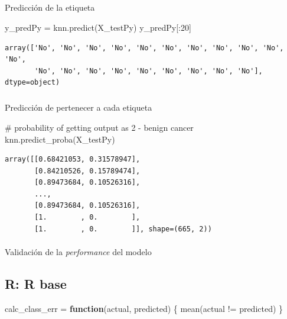 \documentclass[
  letterpaper,
  DIV=11,
  numbers=noendperiod]{scrartcl}
\makeatletter
\let\oldparagraph\paragraph
\renewcommand{\paragraph}{
    \@ifstar
      \xxxParagraphStar
      \xxxParagraphNoStar
  }
\newcommand{\xxxParagraphStar}[1]{\oldparagraph*{#1}\mbox{}}
\newcommand{\xxxParagraphNoStar}[1]{\oldparagraph{#1}\mbox{}}
\let\oldsubparagraph\subparagraph
\renewcommand{\subparagraph}{
    \@ifstar
      \xxxSubParagraphStar
      \xxxSubParagraphNoStar
  }
\newcommand{\xxxSubParagraphStar}[1]{\oldsubparagraph*{#1}\mbox{}}
\newcommand{\xxxSubParagraphNoStar}[1]{\oldsubparagraph{#1}\mbox{}}
\newenvironment{Shaded}{\begin{snugshade}}{\end{snugshade}}
\newcommand{\CommentTok}[1]{\textcolor[rgb]{0.37,0.37,0.37}{#1}}
\newcommand{\ControlFlowTok}[1]{\textcolor[rgb]{0.00,0.23,0.31}{\textbf{#1}}}
\newcommand{\DecValTok}[1]{\textcolor[rgb]{0.68,0.00,0.00}{#1}}
\newcommand{\FunctionTok}[1]{\textcolor[rgb]{0.28,0.35,0.67}{#1}}
\newcommand{\NormalTok}[1]{\textcolor[rgb]{0.00,0.23,0.31}{#1}}
\newcommand{\OperatorTok}[1]{\textcolor[rgb]{0.37,0.37,0.37}{#1}}
\newcommand{\OtherTok}[1]{\textcolor[rgb]{0.00,0.23,0.31}{#1}}
\newcommand{\SpecialCharTok}[1]{\textcolor[rgb]{0.37,0.37,0.37}{#1}}
\makeatother
\begin{document}
\subparagraph{Predicción de la
etiqueta}\label{predicciuxf3n-de-la-etiqueta}

\begin{Shaded}
\begin{Highlighting}[]
\NormalTok{y\_predPy }\OperatorTok{=}\NormalTok{ knn.predict(X\_testPy)}
\NormalTok{y\_predPy[:}\DecValTok{20}\NormalTok{]}
\end{Highlighting}
\end{Shaded}

\begin{verbatim}
array(['No', 'No', 'No', 'No', 'No', 'No', 'No', 'No', 'No', 'No', 'No',
       'No', 'No', 'No', 'No', 'No', 'No', 'No', 'No', 'No'], dtype=object)
\end{verbatim}

\subparagraph{Predicción de pertenecer a cada
etiqueta}\label{predicciuxf3n-de-pertenecer-a-cada-etiqueta}

\begin{Shaded}
\begin{Highlighting}[]
\CommentTok{\# probability of getting output as 2 {-} benign cancer}
\NormalTok{knn.predict\_proba(X\_testPy)}
\end{Highlighting}
\end{Shaded}

\begin{verbatim}
array([[0.68421053, 0.31578947],
       [0.84210526, 0.15789474],
       [0.89473684, 0.10526316],
       ...,
       [0.89473684, 0.10526316],
       [1.        , 0.        ],
       [1.        , 0.        ]], shape=(665, 2))
\end{verbatim}

\paragraph{\texorpdfstring{Validación de la \emph{performance} del
modelo}{Validación de la performance del modelo}}\label{validaciuxf3n-de-la-performance-del-modelo}

\subsection{R: R base}

\begin{Shaded}
\begin{Highlighting}[]
\NormalTok{calc\_class\_err }\OtherTok{=} \ControlFlowTok{function}\NormalTok{(actual, predicted) \{}
  \FunctionTok{mean}\NormalTok{(actual }\SpecialCharTok{!=}\NormalTok{ predicted)}
\NormalTok{\}}
\end{Highlighting}
\end{Shaded}
\end{document}
